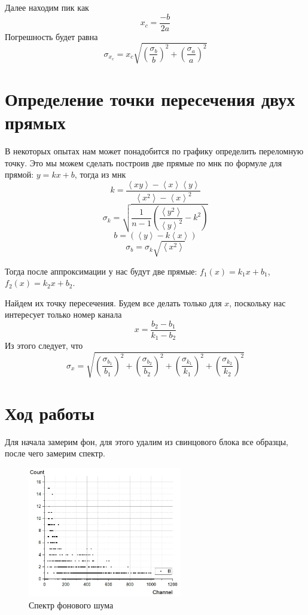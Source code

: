 \documentclass[a4paper, 12pt]{article}%
\begin{document}
Далее находим пик как
\[x_c = \frac{-b}{2a}\]
Погрешность будет равна
\[\sigma_{x_c} = x_c\sqrt{\left(\frac{\sigma_b}{b}\right)^2 + \left(\frac{\sigma_a}{a}\right)^2}\]
\section*{Определение точки пересечения двух прямых}
В некоторых опытах нам может понадобится по графику определить переломную точку. Это мы можем сделать построив две прямые по мнк по формуле для прямой: $y = kx + b$, тогда из мнк 
\[k = \frac{\left<xy\right>  - \left<x\right>\left<y\right>}{\left<x^2\right> - \left<x\right>^2}\]
\[\sigma_k = \sqrt{\frac{1}{n-1} \left(\frac{\left<y^2\right>}{\left<y\right>^2} - k^2\right)}\]
\[b = (\left<y\right> - k\left<x\right>)\]
\[\sigma_b =  \sigma_k\sqrt{\left<x^2\right>}\]

Тогда после аппроксимации у нас будут две прямые: $f_1(x) = k_1 x + b_1$,$f_2(x) = k_2 x + b_2$. 

Найдем их точку пересечения. Будем все делать только для $x$, поскольку нас интересует только номер канала
\[x = \frac{b_2 - b_1}{k_1 - b_2}\]
Из этого следует, что 
\[\sigma_x = \sqrt{\left( \frac{\sigma_{b_1}}{b_1}\right)^2 + \left( \frac{\sigma_{b_2}}{b_2}\right)^2 + \left( \frac{\sigma_{k_1}}{k_1}\right)^2 + \left( \frac{\sigma_{k_2}}{k_2}\right)^2}\]
\section*{Ход работы}
Для начала замерим фон, для этого удалим из свинцового блока все образцы, после чего замерим спектр.

\begin{figure}[h]
\begin{center}
\includegraphics[width = 0.6\textwidth]{7.jpg}
\caption{Спектр фонового шума}
\end{center}
\end{figure}
\end{document}

